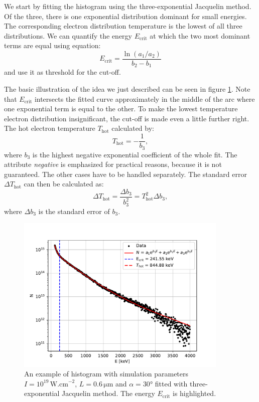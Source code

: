We start by fitting the histogram using the three-exponential Jacquelin method. Of the three, there is one exponential distribution dominant for small energies. The corresponding electron distribution temperature is the lowest of all three distributions. We can quantify the energy $E_{\mathrm{crit}}$ at which the two most dominant terms are equal using equation:
\begin{equation}
	E_{\mathrm{crit}} = \frac{\ln{\left(a_1/a_2\right)}}{b_2-b_1}
\end{equation}
and use it as threshold for the cut-off. 

The basic illustration of the idea we just described can be seen in figure \ref{fig:3exp-fit-cut-example}. Note that $E_{\mathrm{crit}}$ intersects the fitted curve approximately in the middle of the arc where one exponential term is equal to the other. To make the lowest temperature electron distribution insignificant, the cut-off is made even a little further right. The hot electron temperature $T_\mathrm{hot}$ calculated by:
\begin{equation}
	T_{\mathrm{hot}} = -\frac{1}{b_3},
\end{equation}
where $b_3$ is the highest negative exponential coefficient of the whole fit. The attribute \textit{negative} is emphasized for practical reasons, because it is not guaranteed. The other cases have to be handled separately. The standard error $\Delta T_\mathrm{hot}$ can then be calculated as:
\begin{equation}
	\Delta T_\mathrm{hot} = \frac{\Delta b_3}{b_3^2} = T_\mathrm{hot}^2\Delta b_3,
\end{equation}
where $\Delta b_3$ is the standard error of $b_3$. 
	
\begin{figure}[ht]
	\centering
	\includegraphics[width=0.9\textwidth]{figures/hist_1e19_060_30_3exp}
	\caption{An example of histogram with simulation parameters $I=10^{19}\,\mathrm{W.cm}^{-2}$, $L=0.6\,\mathrm{\mu m}$ and $\alpha = 30$° fitted with three-exponential Jacquelin method. The energy $E_{\mathrm{crit}}$ is highlighted.}
	\label{fig:3exp-fit-cut-example}
\end{figure}

